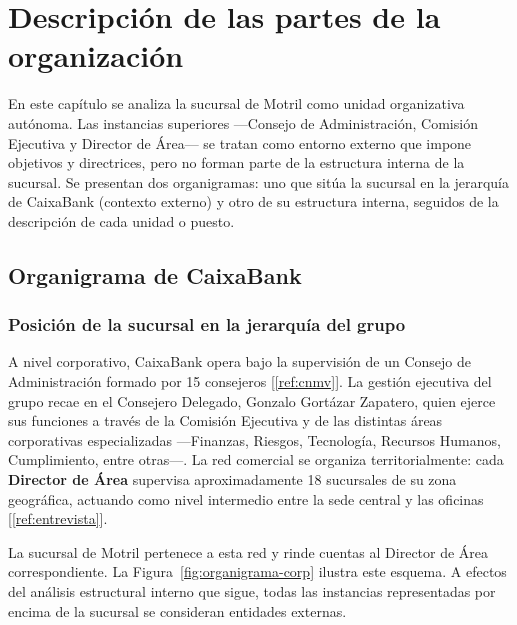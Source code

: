 
\usetikzlibrary{positioning, arrows.meta, calc}

\chapter{Descripción de las partes de la organización}

En este capítulo se analiza la sucursal de Motril como unidad organizativa autónoma.
Las instancias superiores ---Consejo de Administración, Comisión Ejecutiva y Director
de Área--- se tratan como entorno externo que impone objetivos y directrices, pero no
forman parte de la estructura interna de la sucursal. Se presentan dos organigramas:
uno que sitúa la sucursal en la jerarquía de CaixaBank (contexto externo) y otro de
su estructura interna, seguidos de la descripción de cada unidad o puesto.

\section{Organigrama de CaixaBank}

\subsection{Posición de la sucursal en la jerarquía del grupo}

A nivel corporativo, CaixaBank opera bajo la supervisión de un Consejo de Administración
formado por 15 consejeros [\ref{ref:cnmv}]. La gestión ejecutiva del grupo recae en el
Consejero Delegado, Gonzalo Gortázar Zapatero, quien ejerce sus funciones a través de
la Comisión Ejecutiva y de las distintas áreas corporativas especializadas ---Finanzas,
Riesgos, Tecnología, Recursos Humanos, Cumplimiento, entre otras---. La red comercial
se organiza territorialmente: cada \textbf{Director de Área} supervisa aproximadamente
18 sucursales de su zona geográfica, actuando como nivel intermedio entre la sede central
y las oficinas [\ref{ref:entrevista}].

La sucursal de Motril pertenece a esta red y rinde cuentas al Director de Área
correspondiente. La Figura~\ref{fig:organigrama-corp} ilustra este esquema. A efectos
del análisis estructural interno que sigue, todas las instancias representadas por
encima de la sucursal se consideran entidades externas.

